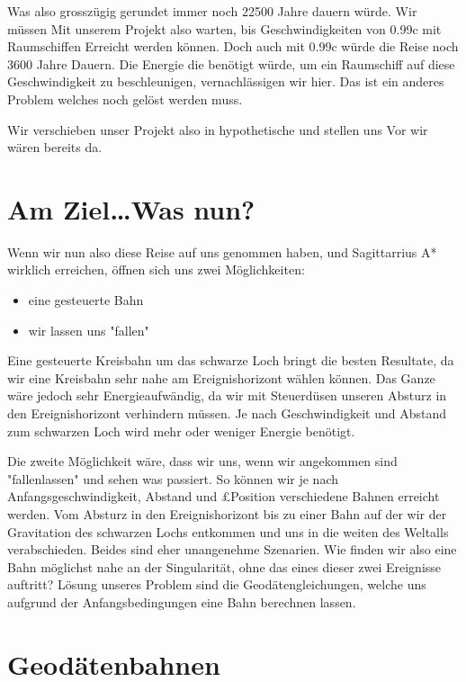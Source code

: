 \begin{refsection}
	Was also grosszügig gerundet immer noch 22500 Jahre dauern würde. 
	Wir müssen Mit unserem Projekt also warten, bis Geschwindigkeiten von 0.99c mit Raumschiffen Erreicht werden können. Doch auch mit 0.99c würde die Reise noch 3600 Jahre Dauern. Die Energie die benötigt würde, um ein Raumschiff auf diese Geschwindigkeit zu beschleunigen, vernachlässigen wir hier. Das ist ein anderes Problem welches noch gelöst werden muss.
	
	Wir verschieben unser Projekt also in hypothetische und stellen uns Vor wir wären bereits da.
	
	\section{Am Ziel\dots Was nun?}
	
	Wenn wir nun also diese Reise auf uns genommen haben, und Sagittarrius A* wirklich erreichen, öffnen sich uns zwei Möglichkeiten:
	
	\begin{itemize}
		\item eine gesteuerte Bahn
		\item wir lassen uns "fallen"
	\end{itemize}

	Eine gesteuerte Kreisbahn um das schwarze Loch bringt die besten Resultate, da wir eine Kreisbahn sehr nahe am Ereignishorizont wählen können. Das Ganze wäre jedoch sehr Energieaufwändig, da wir mit Steuerdüsen unseren Absturz in den Ereignishorizont verhindern müssen. Je nach Geschwindigkeit und Abstand zum schwarzen Loch wird mehr oder weniger Energie benötigt.
	
	Die zweite Möglichkeit wäre, dass wir uns, wenn wir angekommen sind "fallenlassen" und sehen was passiert. So können wir je nach Anfangsgeschwindigkeit, Abstand und £Position verschiedene Bahnen erreicht werden. Vom Absturz in den Ereignishorizont bis zu einer Bahn auf der wir der Gravitation des schwarzen Lochs entkommen und uns in die weiten des Weltalls verabschieden. Beides sind eher unangenehme Szenarien. 
	Wie finden wir also eine Bahn möglichst nahe an der Singularität, ohne das eines dieser zwei Ereignisse auftritt?
	Lösung unseres Problem sind die Geodätengleichungen, welche uns aufgrund der Anfangsbedingungen eine Bahn berechnen lassen.
	
	
	\section{Geodätenbahnen}
	

\end{refsection}

